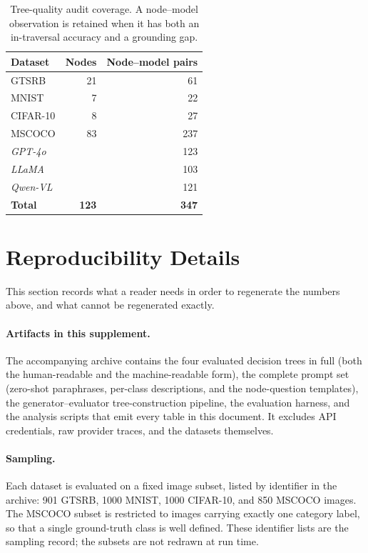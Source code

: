 \documentclass[10pt,twocolumn,letterpaper]{article}
\begin{document}
\begin{table}[t]
\centering
\caption{Tree-quality audit coverage. A node--model observation is retained when it has both an in-traversal accuracy and a grounding gap.}
\label{tab:supp_audit_coverage}
\footnotesize
\begin{tabular}{@{}lrr@{}}
\toprule
\textbf{Dataset} & \textbf{Nodes} & \textbf{Node--model pairs} \\
\midrule
GTSRB     & 21 & 61 \\
MNIST     & 7 & 22 \\
CIFAR-10  & 8 & 27 \\
MSCOCO    & 83 & 237 \\
\midrule
\textit{GPT-4o} & & 123 \\
\textit{LLaMA} & & 103 \\
\textit{Qwen-VL} & & 121 \\
\midrule
\textbf{Total} & \textbf{123} & \textbf{347} \\
\bottomrule
\end{tabular}
\end{table}


\section{Reproducibility Details}
\label{sec:supp_repro}

This section records what a reader needs in order to regenerate the numbers
above, and what cannot be regenerated exactly.

\paragraph{Artifacts in this supplement.} The accompanying archive contains the
four evaluated decision trees in full (both the human-readable and the
machine-readable form), the complete prompt set (zero-shot paraphrases,
per-class descriptions, and the node-question templates), the
generator--evaluator tree-construction pipeline, the evaluation harness, and
the analysis scripts that emit every table in this document. It excludes API
credentials, raw provider traces, and the datasets themselves.

\paragraph{Sampling.} Each dataset is evaluated on a fixed image subset, listed
by identifier in the archive: 901 GTSRB, 1000 MNIST, 1000 CIFAR-10, and 850
MSCOCO images. The MSCOCO subset is restricted to images carrying exactly one
category label, so that a single ground-truth class is well defined. These
identifier lists are the sampling record; the subsets are not redrawn at run
time.
\end{document}
